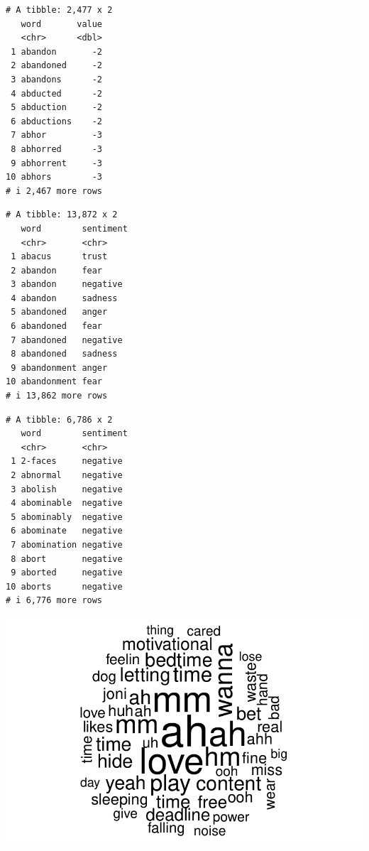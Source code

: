 \documentclass[
  letterpaper,
  DIV=11,
  numbers=noendperiod]{scrartcl}
\begin{document}
\begin{verbatim}
# A tibble: 2,477 x 2
   word       value
   <chr>      <dbl>
 1 abandon       -2
 2 abandoned     -2
 3 abandons      -2
 4 abducted      -2
 5 abduction     -2
 6 abductions    -2
 7 abhor         -3
 8 abhorred      -3
 9 abhorrent     -3
10 abhors        -3
# i 2,467 more rows
\end{verbatim}

\begin{verbatim}
# A tibble: 13,872 x 2
   word        sentiment
   <chr>       <chr>    
 1 abacus      trust    
 2 abandon     fear     
 3 abandon     negative 
 4 abandon     sadness  
 5 abandoned   anger    
 6 abandoned   fear     
 7 abandoned   negative 
 8 abandoned   sadness  
 9 abandonment anger    
10 abandonment fear     
# i 13,862 more rows
\end{verbatim}

\begin{verbatim}
# A tibble: 6,786 x 2
   word        sentiment
   <chr>       <chr>    
 1 2-faces     negative 
 2 abnormal    negative 
 3 abolish     negative 
 4 abominable  negative 
 5 abominably  negative 
 6 abominate   negative 
 7 abomination negative 
 8 abort       negative 
 9 aborted     negative 
10 aborts      negative 
# i 6,776 more rows
\end{verbatim}

\includegraphics{MP4_files/figure-pdf/unnamed-chunk-9-1.pdf}
\end{document}
